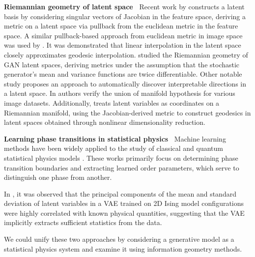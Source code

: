 \documentclass{article}
\theoremstyle{plain}
\theoremstyle{definition}
\theoremstyle{remark}
\begin{document}
\textbf{Riemannian geometry of latent space~} Recent work by \citet{park2023understanding} constructs a latent basis by considering singular vectors of Jacobian in the feature space, deriving a metric on a latent space via pullback from the euclidean metric in the feature space.
A similar pullback-based approach from euclidean metric in image space was used by \citet{shao2018riemannian}. It was demonstrated that linear interpolation in the latent space closely approximates geodesic interpolation.
\citet{arvanitidis2017latent} studied the Riemannian geometry of GAN latent spaces, deriving metrics under the assumption that the stochastic generator's mean and variance functions are twice differentiable. 
Other notable study \cite{li2024self} proposes an approach to automatically discover interpretable directions in a latent space.
In \cite{brown2022verifying} authors verify the union of manifold hypothesis 
for various image datasets.
Additionally, \citet{tosi2014metrics} treats latent variables as coordinates on a Riemannian manifold, using the Jacobian-derived metric to construct geodesics in latent spaces obtained through nonlinear dimensionality reduction.


\textbf{Learning phase transitions in statistical physics~} Machine learning methods have been widely applied to the study of classical and quantum statistical physics models \cite{van2017learning, carrasquilla2017machine, rem2019identifying, wang2021unsupervised, canabarro2019unveiling}. These works primarily focus on determining phase transition boundaries and extracting learned order parameters, which serve to distinguish one phase from another. 

In \cite{walker2020deep}, it was observed that the principal components of the mean and standard deviation of latent variables in a VAE trained on 2D Ising model configurations were highly correlated with known physical quantities, suggesting that the VAE implicitly extracts sufficient statistics from the data.

We could unify these two approaches by considering a generative model as a statistical physics system and examine it using information geometry methods.
\end{document}
